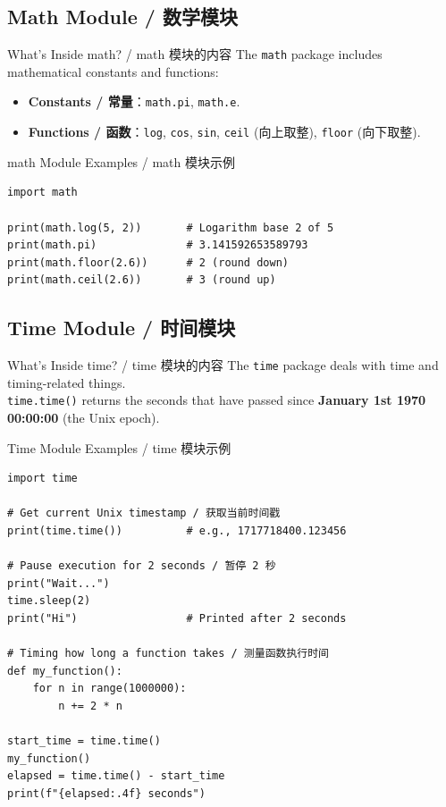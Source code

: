 \documentclass[11pt,a4paper]{report}
\let\oldtexttt\texttt
\renewcommand{\texttt}[1]{\textcolor{mainblue}{\oldtexttt{#1}}}
\begin{document}
\subsection{Math Module / 数学模块}

\begin{concept}{What's Inside math? / math 模块的内容}
    The \texttt{math} package includes mathematical constants and functions:
    \begin{itemize}[itemsep=0.3em]
        \item \textbf{Constants / 常量}：\texttt{math.pi}, \texttt{math.e}.
        \item \textbf{Functions / 函数}：\texttt{log}, \texttt{cos}, \texttt{sin}, \texttt{ceil} (向上取整), \texttt{floor} (向下取整).
    \end{itemize}
\end{concept}

\begin{examplebox}{math Module Examples / math 模块示例}
\begin{lstlisting}
import math

print(math.log(5, 2))       # Logarithm base 2 of 5
print(math.pi)              # 3.141592653589793
print(math.floor(2.6))      # 2 (round down)
print(math.ceil(2.6))       # 3 (round up)
\end{lstlisting}
\end{examplebox}

\subsection{Time Module / 时间模块}

\begin{concept}{What's Inside time? / time 模块的内容}
    The \texttt{time} package deals with time and timing-related things. \\
    \texttt{time.time()} returns the seconds that have passed since \textbf{January 1st 1970 00:00:00} (the Unix epoch).
\end{concept}

\begin{examplebox}{Time Module Examples / time 模块示例}
\begin{lstlisting}
import time

# Get current Unix timestamp / 获取当前时间戳
print(time.time())          # e.g., 1717718400.123456

# Pause execution for 2 seconds / 暂停 2 秒
print("Wait...")
time.sleep(2)
print("Hi")                 # Printed after 2 seconds

# Timing how long a function takes / 测量函数执行时间
def my_function():
    for n in range(1000000):
        n += 2 * n

start_time = time.time()
my_function()
elapsed = time.time() - start_time
print(f"{elapsed:.4f} seconds")
\end{lstlisting}
\end{examplebox}
\end{document}

